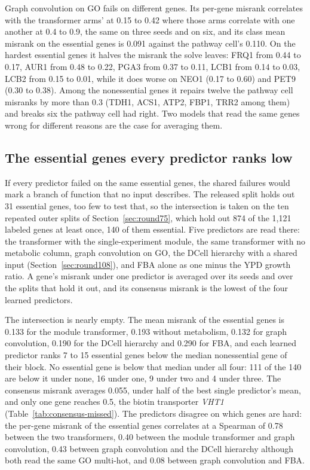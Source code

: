 Graph convolution on GO fails on different genes. Its per-gene misrank correlates
with the transformer arms' at 0.15 to 0.42 where those arms correlate with one another
at 0.4 to 0.9, the same on three seeds and on six, and its class mean misrank on the
essential genes is 0.091 against the
pathway cell's 0.110. On the hardest essential genes it halves the misrank the solve
leaves: FRQ1 from 0.44 to 0.17, AUR1 from 0.48 to 0.22, PGA3 from 0.37 to 0.11, LCB1
from 0.14 to 0.03, LCB2 from 0.15 to 0.01, while it does worse on NEO1 (0.17 to 0.60)
and PET9 (0.30 to 0.38). Among the nonessential genes it repairs twelve the pathway
cell misranks by more than 0.3 (TDH1, ACS1, ATP2, FBP1, TRR2 among them) and breaks six
the pathway cell had right. Two models that read the same genes wrong for different
reasons are the case for averaging them.

\subsection{The essential genes every predictor ranks low}
\label{sec:consensus-missed}

If every predictor failed on the same essential genes, the shared failures would mark a
branch of function that no input describes. The released split holds out 31 essential
genes, too few to test that, so the intersection is taken on the ten repeated outer
splits of Section~\ref{sec:round75}, which hold out 874 of the 1,121 labeled genes at
least once, 140 of them essential. Five predictors are read there: the transformer with
the single-experiment module, the same transformer with no metabolic column, graph
convolution on GO, the DCell hierarchy with a shared input
(Section~\ref{sec:round108}), and FBA alone as one minus the YPD growth ratio. A gene's
misrank under one predictor is averaged over its seeds and over the splits that hold it
out, and its consensus misrank is the lowest of the four learned predictors.

The intersection is nearly empty. The mean misrank of the essential genes is 0.133 for
the module transformer, 0.193 without metabolism, 0.132 for graph convolution, 0.190 for
the DCell hierarchy and 0.290 for FBA, and each learned predictor ranks 7 to 15 essential
genes below the median nonessential gene of their block. No essential gene is below that
median under all four: 111 of the 140 are below it under none, 16 under one, 9 under two
and 4 under three. The consensus misrank averages 0.055, under half of the best single
predictor's mean, and only one gene reaches 0.5, the biotin transporter \textit{VHT1}
(Table~\ref{tab:consensus-missed}). The predictors disagree on which genes are hard: the
per-gene misrank of the essential genes correlates at a Spearman of 0.78 between the two
transformers, 0.40 between the module transformer and graph convolution, 0.43 between
graph convolution and the DCell hierarchy although both read the same GO multi-hot, and
0.08 between graph convolution and FBA.

